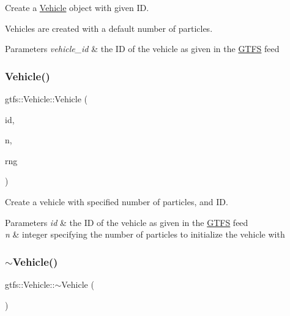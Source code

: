 Create a \hyperlink{classgtfs_1_1Vehicle}{Vehicle} object with given ID.

Vehicles are created with a default number of particles.


\begin{DoxyParams}{Parameters}
{\em vehicle\+\_\+id} & the ID of the vehicle as given in the \hyperlink{classgtfs_1_1GTFS}{G\+T\+FS} feed \\
\hline
\end{DoxyParams}
\mbox{\label{classgtfs_1_1Vehicle_a12765a61077b4be7e65ab67b63eb9fcc}} 
\subsubsection{\texorpdfstring{Vehicle()}{Vehicle()}\hspace{0.1cm}{\footnotesize\ttfamily [2/2]}}
{\footnotesize\ttfamily gtfs\+::\+Vehicle\+::\+Vehicle (\begin{DoxyParamCaption}\item[{std\+::string}]{id,  }\item[{unsigned int}]{n,  }\item[{\hyperlink{classsampling_1_1RNG}{sampling\+::\+R\+NG} \&}]{rng }\end{DoxyParamCaption})}

Create a vehicle with specified number of particles, and ID.


\begin{DoxyParams}{Parameters}
{\em id} & the ID of the vehicle as given in the \hyperlink{classgtfs_1_1GTFS}{G\+T\+FS} feed \\
\hline
{\em n} & integer specifying the number of particles to initialize the vehicle with \\
\hline
\end{DoxyParams}
\mbox{\label{classgtfs_1_1Vehicle_a08c7450dd0df9406f78b30be044d27d8}} 
\subsubsection{\texorpdfstring{$\sim$\+Vehicle()}{~Vehicle()}}
{\footnotesize\ttfamily gtfs\+::\+Vehicle\+::$\sim$\+Vehicle (\begin{DoxyParamCaption}{ }\end{DoxyParamCaption})}

